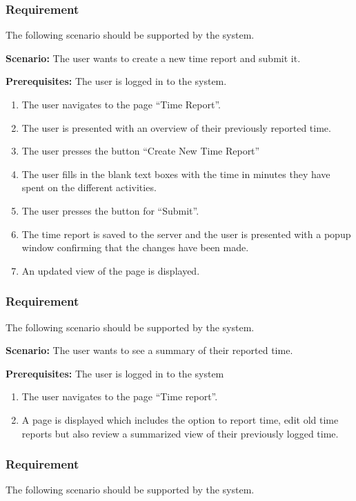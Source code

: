 \documentclass{article}
\begin{document}
\subsubsection{Requirement}
The following scenario should be supported by the system.

\textbf{Scenario:} The user wants to create a new time report and submit it. 

\textbf{Prerequisites:} The user is logged in to the system.

\begin{enumerate}


\item The user navigates to the page “Time Report”. 
\item The user is presented with an overview of their previously reported time. 
\item The user presses the button “Create New Time Report”
\item The user fills in the blank text boxes with the time in minutes they have spent on the different activities.
\item The user presses the button for “Submit”.
\item The time report is saved to the server and the user is presented with a popup window confirming that the changes have been made.
\item An updated view of the page is displayed.
\end{enumerate}

\subsubsection{Requirement}
The following scenario should be supported by the system.

\textbf{Scenario:} The user wants to see a summary of their reported time.

\textbf{Prerequisites:} The user is logged in to the system
\begin{enumerate}


\item The user navigates to the page “Time report”.
\item A page is displayed which includes the option to report time, edit old time reports but also review a summarized view of their previously logged time. 
\end{enumerate}

\subsubsection{Requirement}
The following scenario should be supported by the system.
\end{document}
